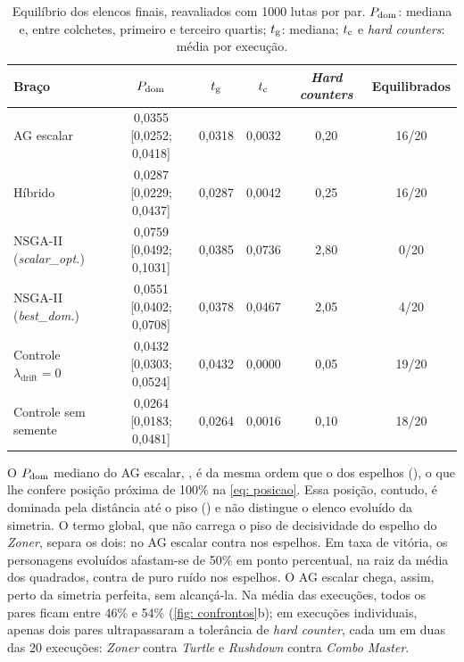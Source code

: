 \begin{table}[htb]
    \caption[Equilíbrio dos elencos finais]{Equilíbrio dos elencos finais, reavaliados com 1000 lutas por par. $P_{\mathrm{dom}}$: mediana e, entre colchetes, primeiro e terceiro quartis; $t_{\mathrm{g}}$: mediana; $t_{\mathrm{c}}$ e \textit{hard counters}: média por execução.}
    \label{tab: equilibrio}
    \centering
    \footnotesize
    \setlength{\tabcolsep}{4pt}
    \begin{tabular}{l c c c c c}
        \toprule
        \textbf{Braço} & $P_{\mathrm{dom}}$ & $t_{\mathrm{g}}$ & $t_{\mathrm{c}}$ & \textbf{\textit{Hard counters}} & \textbf{Equilibrados} \\
        \midrule
        AG escalar                      & 0,0355 [0,0252; 0,0418] & 0,0318 & 0,0032 & 0,20 & 16/20 \\
        Híbrido                         & 0,0287 [0,0229; 0,0437] & 0,0287 & 0,0042 & 0,25 & 16/20 \\
        NSGA-II (\textit{scalar\_opt.}) & 0,0759 [0,0492; 0,1031] & 0,0385 & 0,0736 & 2,80 & 0/20 \\
        NSGA-II (\textit{best\_dom.}) & 0,0551 [0,0402; 0,0708] & 0,0378 & 0,0467 & 2,05 & 4/20 \\
        Controle $\lambda_{\mathrm{drift}} = 0$ & 0,0432 [0,0303; 0,0524] & 0,0432 & 0,0000 & 0,05 & 19/20 \\
        Controle sem semente            & 0,0264 [0,0183; 0,0481] & 0,0264 & 0,0016 & 0,10 & 18/20 \\
        \bottomrule
    \end{tabular}
    \source
\end{table}

O $P_{\mathrm{dom}}$ mediano do AG escalar, \domAG{}, é da mesma ordem que o dos espelhos (\nuloDomEspelho{}), o que lhe confere posição próxima de 100\% na \autoref{eq: posicao}. Essa posição, contudo, é dominada pela distância até o piso (\nuloDomPiso{}) e não distingue o elenco evoluído da simetria. O termo global, que não carrega o piso de decisividade do espelho do \textit{Zoner}, separa os dois: \globAG{} no AG escalar contra \nuloGlobEspelho{} nos espelhos. Em taxa de vitória, os personagens evoluídos afastam-se de 50\% em \desvGlobAGpp{} ponto percentual, na raiz da média dos quadrados, contra \desvGlobEspelhopp{} de puro ruído nos espelhos. O AG escalar chega, assim, perto da simetria perfeita, sem alcançá-la. Na média das execuções, todos os pares ficam entre 46\% e 54\% (\autoref{fig: confrontos}b); em execuções individuais, apenas dois pares ultrapassaram a tolerância de \textit{hard counter}, cada um em duas das 20 execuções: \textit{Zoner} contra \textit{Turtle} e \textit{Rushdown} contra \textit{Combo Master}.


